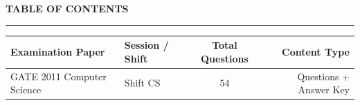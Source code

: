 \documentclass[a4paper,10pt,twoside]{article}
\begin{document}
\newpage

\begin{center}
    {\Large\textbf{TABLE OF CONTENTS}}\\[0.4em]
    \rule{0.5\textwidth}{0.6pt}
\end{center}
\vspace{1em}

\noindent\begin{tabularx}{\linewidth}{|X|l|c|r|}
\hline
\textbf{Examination Paper} & \textbf{Session / Shift} & \textbf{Total Questions} & \textbf{Content Type} \\
\hline

GATE 2011 Computer Science & Shift CS & 54 & Questions + Answer Key \\ \hline
\end{tabularx}

\vspace{1.5em}

\newpage
\end{document}
